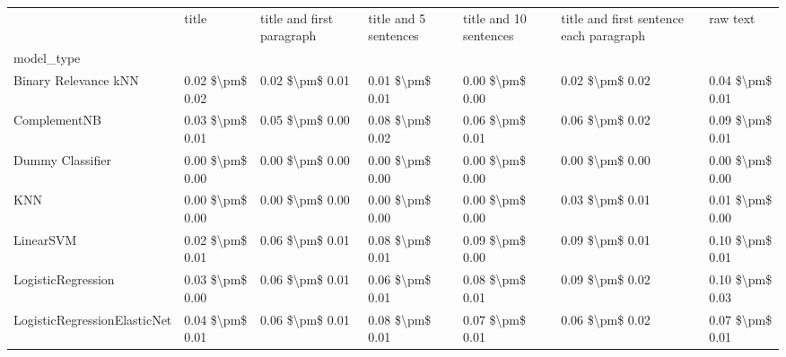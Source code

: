 \begin{tabular}{lllllll}
\toprule
{} &            title & title and first paragraph & title and 5 sentences & title and 10 sentences & title and first sentence each paragraph &             raw text \\
model\_type                      &                  &                           &                       &                        &                                         &                      \\
\midrule
Binary Relevance kNN            &  0.02 \$\textbackslash pm\$ 0.02 &           0.02 \$\textbackslash pm\$ 0.01 &       0.01 \$\textbackslash pm\$ 0.01 &        0.00 \$\textbackslash pm\$ 0.00 &                         0.02 \$\textbackslash pm\$ 0.02 &      0.04 \$\textbackslash pm\$ 0.01 \\
ComplementNB                    &  0.03 \$\textbackslash pm\$ 0.01 &           0.05 \$\textbackslash pm\$ 0.00 &       0.08 \$\textbackslash pm\$ 0.02 &        0.06 \$\textbackslash pm\$ 0.01 &                         0.06 \$\textbackslash pm\$ 0.02 &      0.09 \$\textbackslash pm\$ 0.01 \\
Dummy Classifier                &  0.00 \$\textbackslash pm\$ 0.00 &           0.00 \$\textbackslash pm\$ 0.00 &       0.00 \$\textbackslash pm\$ 0.00 &        0.00 \$\textbackslash pm\$ 0.00 &                         0.00 \$\textbackslash pm\$ 0.00 &      0.00 \$\textbackslash pm\$ 0.00 \\
KNN                             &  0.00 \$\textbackslash pm\$ 0.00 &           0.00 \$\textbackslash pm\$ 0.00 &       0.00 \$\textbackslash pm\$ 0.00 &        0.00 \$\textbackslash pm\$ 0.00 &                         0.03 \$\textbackslash pm\$ 0.01 &      0.01 \$\textbackslash pm\$ 0.00 \\
LinearSVM                       &  0.02 \$\textbackslash pm\$ 0.01 &           0.06 \$\textbackslash pm\$ 0.01 &       0.08 \$\textbackslash pm\$ 0.01 &        0.09 \$\textbackslash pm\$ 0.00 &                         0.09 \$\textbackslash pm\$ 0.01 &      0.10 \$\textbackslash pm\$ 0.01 \\
LogisticRegression              &  0.03 \$\textbackslash pm\$ 0.00 &           0.06 \$\textbackslash pm\$ 0.01 &       0.06 \$\textbackslash pm\$ 0.01 &        0.08 \$\textbackslash pm\$ 0.01 &                         0.09 \$\textbackslash pm\$ 0.02 &      0.10 \$\textbackslash pm\$ 0.03 \\
LogisticRegressionElasticNet    &  0.04 \$\textbackslash pm\$ 0.01 &           0.06 \$\textbackslash pm\$ 0.01 &       0.08 \$\textbackslash pm\$ 0.01 &        0.07 \$\textbackslash pm\$ 0.01 &                         0.06 \$\textbackslash pm\$ 0.02 &      0.07 \$\textbackslash pm\$ 0.01 \\

\end{tabular}
